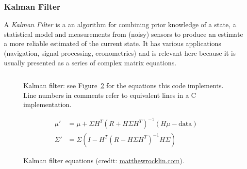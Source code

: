 \subsubsection{Kalman Filter}

A \emph{Kalman Filter}\cite{kalman} is a an algorithm for combining prior
knowledge of a state, a statistical model and measurements from (noisy) sensors
to produce an estimate a more reliable estimated of the current state.  It has
various applications (navigation, signal-processing, econometrics) and is
relevant here because it is usually presented as a series of complex matrix
equations.

\begin{figure}[t]
    \centering
    \inputminted[fontsize=\small]{ocaml}{../../test/examples/kalman.lt}
    \caption{Kalman filter: see Figure~\ref{fig:kalman_eqns} for the
        equations this code implements. Line numbers in comments refer to
        equivalent lines in a C implementation.}\label{fig:lang_kalman}
\end{figure}

\begin{figure}[t]
    \begin{align*}
        \mu' &= \mu + \Sigma H^T (R + H \Sigma H^T)^{-1} (H \mu - \textrm{data})\\
        \Sigma' &= \Sigma ( I - H^T (R + H \Sigma H^T)^{-1} H \Sigma )
    \end{align*}
    \caption{Kalman filter equations (credit:
    \href{http://matthewrocklin.com/blog/work/2012/11/24/Kalman-Filter}{matthewrocklin.com}).}\label{fig:kalman_eqns}
\end{figure}

